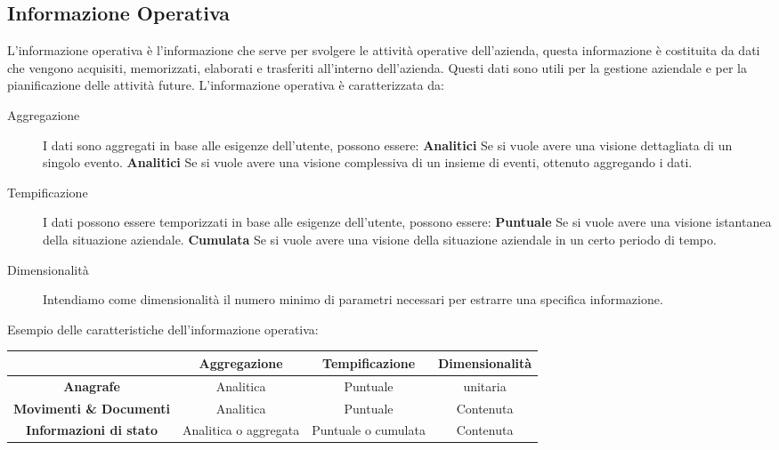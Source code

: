     \subsection{Informazione Operativa}
        L'informazione operativa è l'informazione che serve per svolgere le attività operative dell'azienda, questa informazione è costituita da dati che vengono acquisiti, memorizzati, elaborati e trasferiti all'interno dell'azienda. Questi dati sono utili per la gestione aziendale e per la pianificazione delle attività future. L'informazione operativa è caratterizzata da:
        \begin{description}
            \item[Aggregazione] I dati sono aggregati in base alle esigenze dell'utente, possono essere:
                \subitem \textbf{Analitici} Se si vuole avere una visione dettagliata di un singolo evento.
                \subitem \textbf{Analitici} Se si vuole avere una visione complessiva di un insieme di eventi, ottenuto aggregando i dati.
            \item[Tempificazione] I dati possono essere temporizzati in base alle esigenze dell'utente, possono essere:
                \subitem \textbf{Puntuale} Se si vuole avere una visione istantanea della situazione aziendale.
                \subitem \textbf{Cumulata} Se si vuole avere una visione della situazione aziendale in un certo periodo di tempo.
            \item[Dimensionalità] Intendiamo come dimensionalità il numero minimo di parametri necessari per estrarre una specifica informazione.
        \end{description}
        Esempio delle caratteristiche dell'informazione operativa:
        \begin{table}[H]
            \centering
            \begin{tabular}{|c|c|c|c|}
                \hline
                & \textbf{Aggregazione} & \textbf{Tempificazione} & \textbf{Dimensionalità} \\
                \hline
                \textbf{Anagrafe} & Analitica & Puntuale & unitaria \\
                \hline
                \textbf{Movimenti \& Documenti} & Analitica & Puntuale & Contenuta \\
                \hline
                \textbf{Informazioni di stato} & Analitica o aggregata & Puntuale o cumulata & Contenuta \\
                \hline
            \end{tabular}
        \end{table}
